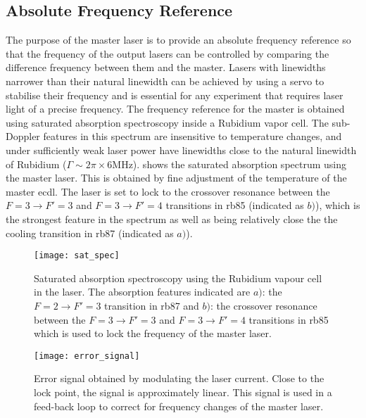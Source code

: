 \subsection{Absolute Frequency Reference} \label{subsec:muquans_master}
The purpose of the master laser is to provide an absolute frequency reference so that the frequency of the output lasers can be controlled by comparing the difference frequency between them and the master. Lasers with linewidths narrower than their natural linewidth can be achieved by using a servo to stabilise their frequency and is essential for any experiment that requires laser light of a precise frequency. The frequency reference for the master is obtained using saturated absorption spectroscopy inside a Rubidium vapor cell. The sub-Doppler features in this spectrum are insensitive to temperature changes, and under sufficiently weak laser power have linewidths close to the natural linewidth of Rubidium (\(\Gamma \sim 2\pi \times 6\)MHz).  shows the saturated absorption spectrum using the \Muquans master laser. This is obtained by fine adjustment of the temperature of the master \ac{ecdl}. The laser is set to lock to the crossover resonance between the \(F = 3 \rightarrow F' = 3\) and \(F = 3 \rightarrow F' =4 \) transitions in \ac{rb85} (indicated as \(b)\)), which is the strongest feature in the spectrum as well as being relatively close the the cooling transition in \ac{rb87} (indicated as \(a)\)).   
\begin{figure}
    \texttt{[image: sat\_spec]}
    \caption[Saturated absorption spectroscopy of the \Muquans master laser.]{Saturated absorption spectroscopy using the Rubidium vapour cell in the \Muquans laser. The absorption features indicated are \(a)\): the \(F = 2 \rightarrow F' = 3\) transition in \ac{rb87} and \(b)\): the crossover resonance between the \(F = 3 \rightarrow F' = 3\) and \(F = 3 \rightarrow F' =4 \) transitions in \ac{rb85} which is used to lock the frequency of the master laser.}
    \label{fig:muquans_satspec}
\end{figure}
\begin{figure}
    \texttt{[image: error\_signal]}
    \caption[Error Signal for the \Muquans master servo.]{Error signal obtained by modulating the laser current. Close to the lock point, the signal is approximately linear. This signal is used in a feed-back loop to correct for frequency changes of the master laser.}
    \label{fig:muquans:error_signal}
\end{figure}
